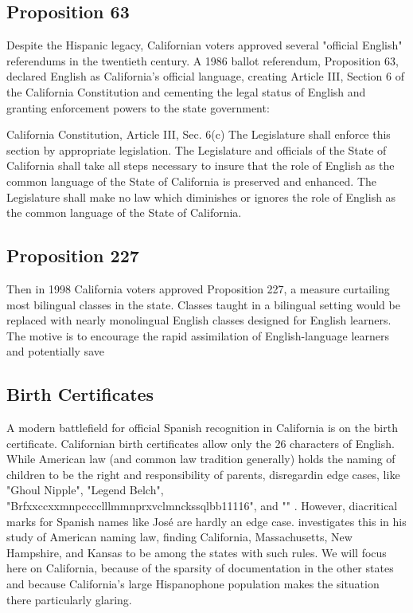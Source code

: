 \subsection{Proposition 63}

Despite the Hispanic legacy, Californian voters approved several "official
English" referendums in the twentieth century. A 1986 ballot referendum,
Proposition 63, declared English as California's official language, creating
Article III, Section 6 of the California Constitution and cementing the legal
status of English and granting enforcement powers to the state government: 

\begin{aquote}{California Constitution, Article III, Sec. 6(c)}
	The Legislature shall enforce this section by appropriate legislation. The
	Legislature and officials of the State of California shall take all steps
	necessary to insure that the role of English as the common language of the
	State of California is preserved and enhanced. The Legislature shall make no
	law which diminishes or ignores the role of English as the common language of
	the State of California. \parencite{ca-const}
\end{aquote}

\subsection{Proposition 227}

Then in 1998 California voters approved Proposition 227, a measure curtailing
most bilingual classes in the state. Classes taught in a bilingual
setting would be replaced with nearly monolingual English classes designed for
English learners. The motive is to encourage the rapid assimilation of
English-language learners and potentially save 

\subsection{Birth Certificates}

A modern battlefield for official Spanish recognition in California is on the
birth certificate. Californian birth certificates allow only the 26 characters
of English. While American law (and common law tradition generally) holds the
naming of children to be the right and responsibility of parents, disregardin
edge cases, like "Ghoul Nipple", "Legend Belch",
"Brfxxccxxmnpcccclllmmnprxvclmnckssqlbb11116", and "" \parencite{larson11}.
However, diacritical marks for Spanish names like José are hardly an edge case.
\textcite[5]{larson11} investigates this in his study of American naming law,
finding California, Massachusetts, New Hampshire, and Kansas to be among the
states with such rules. We will focus here on California, because of the
sparsity of documentation in the other states and because California's large
Hispanophone population makes the situation there particularly glaring.

